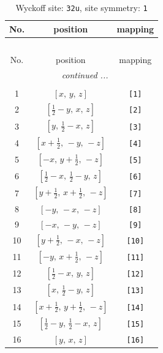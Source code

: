 \documentclass[fleqn,8pt]{jsarticle}
\begin{document}
\renewcommand{\arraystretch}{1.2}
\begin{longtable}{ccc}
\caption{Wyckoff site: {\tt 32u}, site symmetry: {\tt 1}}
 \\
 \hline \hline
No. & position & mapping \\ \hline \endfirsthead

\multicolumn{2}{l}{\tablename\ \thetable{}} \\
 \hline \hline
No. & position & mapping \\ \hline \endhead

 \hline \hline
\multicolumn{2}{r}{\footnotesize\it continued ...} \\ \endfoot

 \hline \hline
\multicolumn{2}{r}{} \\ \endlastfoot

1 & $\left[ x,\, y,\, z \right]$ & {\tt [1]} \\ \hline
2 & $\left[ \frac{1}{2} - y,\, x,\, z \right]$ & {\tt [2]} \\ \hline
3 & $\left[ y,\, \frac{1}{2} - x,\, z \right]$ & {\tt [3]} \\ \hline
4 & $\left[ x + \frac{1}{2},\, - y,\, - z \right]$ & {\tt [4]} \\ \hline
5 & $\left[ - x,\, y + \frac{1}{2},\, - z \right]$ & {\tt [5]} \\ \hline
6 & $\left[ \frac{1}{2} - x,\, \frac{1}{2} - y,\, z \right]$ & {\tt [6]} \\ \hline
7 & $\left[ y + \frac{1}{2},\, x + \frac{1}{2},\, - z \right]$ & {\tt [7]} \\ \hline
8 & $\left[ - y,\, - x,\, - z \right]$ & {\tt [8]} \\ \hline
9 & $\left[ - x,\, - y,\, - z \right]$ & {\tt [9]} \\ \hline
10 & $\left[ y + \frac{1}{2},\, - x,\, - z \right]$ & {\tt [10]} \\ \hline
11 & $\left[ - y,\, x + \frac{1}{2},\, - z \right]$ & {\tt [11]} \\ \hline
12 & $\left[ \frac{1}{2} - x,\, y,\, z \right]$ & {\tt [12]} \\ \hline
13 & $\left[ x,\, \frac{1}{2} - y,\, z \right]$ & {\tt [13]} \\ \hline
14 & $\left[ x + \frac{1}{2},\, y + \frac{1}{2},\, - z \right]$ & {\tt [14]} \\ \hline
15 & $\left[ \frac{1}{2} - y,\, \frac{1}{2} - x,\, z \right]$ & {\tt [15]} \\ \hline
16 & $\left[ y,\, x,\, z \right]$ & {\tt [16]} \\ \hline

\end{longtable}
\end{document}
